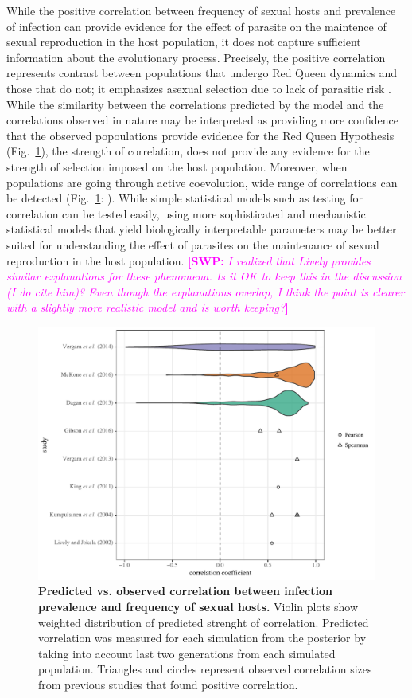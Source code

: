 \documentclass{article}\usepackage[]{graphicx}\usepackage[]{color}
\newcommand{\comment}[3]{\textcolor{#1}{\textbf{[#2: }\textit{#3}\textbf{]}}}
\newcommand{\swp}[1]{\comment{magenta}{SWP}{#1}}
\newcommand{\fref}[1]{Fig.~\ref{fig:#1}}
\begin{document}
While the positive correlation between frequency of sexual hosts and prevalence of infection can provide evidence for the effect of parasite on the maintence of sexual reproduction in the host population, it does not capture sufficient information about the evolutionary process.
Precisely, the positive correlation represents contrast between populations that undergo Red Queen dynamics and those that do not; it emphasizes asexual selection due to lack of parasitic risk \citep{lively2001trematode}.
While the similarity between the correlations predicted by the model and the correlations observed in nature may be interpreted as providing more confidence that the observed popoulations provide evidence for the Red Queen Hypothesis (\fref{effect}), the strength of correlation, does not provide any evidence for the strength of selection imposed on the host population.
Moreover, when populations are going through active coevolution, wide range of correlations can be detected (\fref{effect}: \cite{vergara2014infection}).
While simple statistical models such as testing for correlation can be tested easily,
using more sophisticated and mechanistic statistical models that yield biologically interpretable parameters may be better suited for understanding the effect of parasites on the maintenance of sexual reproduction in the host population.
\swp{I realized that Lively provides similar explanations for these phenomena. Is it OK to keep this in the discussion (I do cite him)? Even though the explanations overlap, I think the point is clearer with a slightly more realistic model and is worth keeping?}

\begin{figure}[!ht]
\includegraphics[width=\textwidth]{../fig/effect_size.pdf}
\caption{{\bf Predicted vs. observed correlation between infection prevalence and frequency of sexual hosts.}
Violin plots show weighted distribution of predicted strenght of correlation.
Predicted vorrelation was measured for each simulation from the posterior by taking into account last two generations from each simulated population.
Triangles and circles represent observed correlation sizes from previous studies that found positive correlation.
}
\label{fig:effect}
\end{figure}
\end{document}
